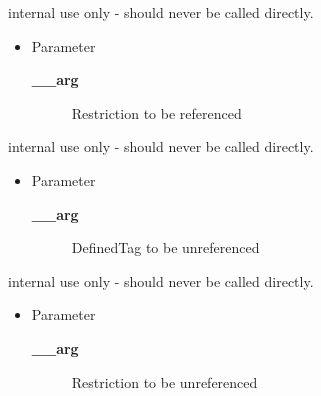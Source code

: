 \begin{desc}internal use only - should never be called directly.
\begin{itemize}
\item{Parameter
  \begin{description}
   \item[{\bf \_\_arg}]{Restriction to be referenced}
  \end{description}}
\end{itemize}
\end{desc}

\begin{desc}internal use only - should never be called directly.
\begin{itemize}
\item{Parameter
  \begin{description}
   \item[{\bf \_\_arg}]{DefinedTag to be unreferenced}
  \end{description}}
\end{itemize}
\end{desc}

\begin{desc}internal use only - should never be called directly.
\begin{itemize}
\item{Parameter
  \begin{description}
   \item[{\bf \_\_arg}]{Restriction to be unreferenced}
  \end{description}}
\end{itemize}
\end{desc}

